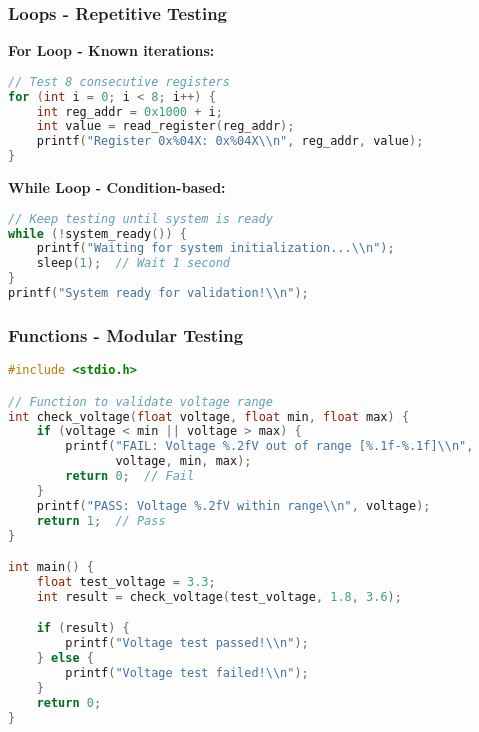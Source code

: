 \documentclass{beamer}
\begin{document}
\begin{frame}[fragile]
\frametitle{Loops - Repetitive Testing}
\textbf{For Loop - Known iterations:}
\begin{lstlisting}[language=C]
// Test 8 consecutive registers
for (int i = 0; i < 8; i++) {
    int reg_addr = 0x1000 + i;
    int value = read_register(reg_addr);
    printf("Register 0x%04X: 0x%04X\\n", reg_addr, value);
}
\end{lstlisting}

\textbf{While Loop - Condition-based:}
\begin{lstlisting}[language=C]
// Keep testing until system is ready
while (!system_ready()) {
    printf("Waiting for system initialization...\\n");
    sleep(1);  // Wait 1 second
}
printf("System ready for validation!\\n");
\end{lstlisting}
\end{frame}

\begin{frame}[fragile]
\frametitle{Functions - Modular Testing}
\begin{lstlisting}[language=C]
#include <stdio.h>

// Function to validate voltage range
int check_voltage(float voltage, float min, float max) {
    if (voltage < min || voltage > max) {
        printf("FAIL: Voltage %.2fV out of range [%.1f-%.1f]\\n",
               voltage, min, max);
        return 0;  // Fail
    }
    printf("PASS: Voltage %.2fV within range\\n", voltage);
    return 1;  // Pass
}

int main() {
    float test_voltage = 3.3;
    int result = check_voltage(test_voltage, 1.8, 3.6);

    if (result) {
        printf("Voltage test passed!\\n");
    } else {
        printf("Voltage test failed!\\n");
    }
    return 0;
}
\end{lstlisting}
\end{frame}
\end{document}
